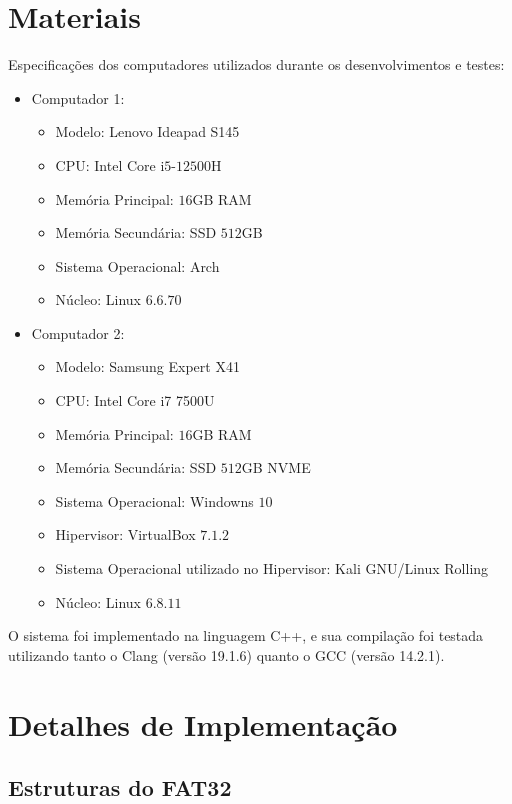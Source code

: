 \documentclass[
    12pt,				%
    oneside,   	        %
    a4paper,			%
    english,			%
    french,				%
    spanish,			%
    brazil,				%
    ]{pacotes/abntex2}
\begin{document}
\section{Materiais}
\label{sec:materiais}

Especificações dos computadores utilizados durante os desenvolvimentos e testes:

\begin{itemize}
  \item Computador 1:
  \begin{itemize}
    \item Modelo: Lenovo Ideapad S145
    \item CPU: Intel Core i$5$-$12500$H
    \item Memória Principal: $16$GB RAM
    \item Memória Secundária: SSD $512$GB
    \item Sistema Operacional: Arch
  \item Núcleo: Linux $6.6.70$ 
  \end{itemize}
  \item Computador 2:
  \begin{itemize}
    \item Modelo: Samsung Expert X41
    \item CPU: Intel Core i7 7500U
    \item Memória Principal: $16$GB RAM
    \item Memória Secundária: SSD $512$GB NVME
    \item Sistema Operacional: Windowns $10$
    \item Hipervisor: VirtualBox $7.1.2$
    \item Sistema Operacional utilizado no Hipervisor: Kali GNU/Linux Rolling
    \item Núcleo: Linux $6.8.11$
  \end{itemize}
\end{itemize}

O sistema foi implementado na linguagem C++, e sua compilação foi testada utilizando tanto o Clang (versão 19.1.6) quanto o GCC (versão 14.2.1).

\section{Detalhes de Implementação}
\label{sec:implementacao}

\subsection{Estruturas do FAT32}
\label{subsubsec:estrutura_fat}
\end{document}
